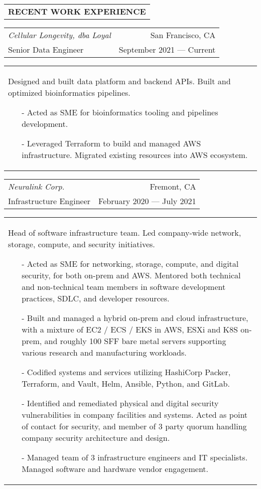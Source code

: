 \begin{tabularx}{\textwidth}{L}
    \textbf{RECENT WORK EXPERIENCE}
\end{tabularx}

\begin{tabularx}{\textwidth}{L R}
    \normalsize\textit{Cellular Longevity, dba Loyal} & San Francisco, CA \\
    \hspace{10pt}Senior Data Engineer & September 2021 --- Current \\
\end{tabularx}
\begin{tabularx}{\textwidth}{X}
    \hspace{10pt}Designed and built data platform and backend APIs. Built and optimized bioinformatics pipelines.
    \begin{itemize}
        \itemsep{}
        \item[-] Acted as SME for bioinformatics tooling and pipelines development.
        \item[-] Leveraged Terraform to build and managed AWS infrastructure. Migrated existing resources into AWS ecosystem.
    \end{itemize}
\end{tabularx}

\begin{tabularx}{\textwidth}{L R}
    \normalsize\textit{Neuralink Corp.} & Fremont, CA \\
    \hspace{10pt}Infrastructure Engineer & February 2020 --- July 2021 \\
\end{tabularx}
\begin{tabularx}{\textwidth}{X}
    \hspace{10pt}Head of software infrastructure team. Led company-wide network, storage, compute, and security initiatives.
    \begin{itemize}
        \itemsep{}
        \item[-] Acted as SME for networking, storage, compute, and digital security, for both on-prem and AWS. Mentored both technical and non-technical team members in software development practices, SDLC, and developer resources.
        \item[-] Built and managed a hybrid on-prem and cloud infrastructure, with a mixture of EC2 / ECS / EKS in AWS, ESXi and K8S on-prem, and roughly 100 SFF bare metal servers supporting various research and manufacturing workloads.
        \item[-] Codified systems and services utilizing HashiCorp Packer, Terraform, and Vault, Helm, Ansible, Python, and GitLab.
        \item[-] Identified and remediated physical and digital security vulnerabilities in company facilities and systems. Acted as point of contact for security, and member of 3 party quorum handling company security architecture and design.
        \item[-] Managed team of 3 infrastructure engineers and IT specialists. Managed software and hardware vendor engagement.
    \end{itemize}
\end{tabularx}

